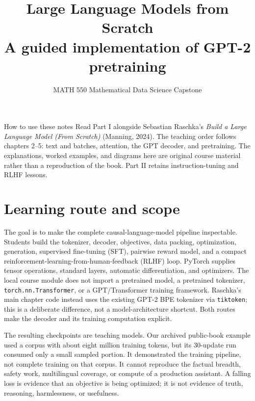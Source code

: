 \documentclass[11pt]{article}
\title{\color{navy}\textbf{Large Language Models from Scratch}\\
\large A guided implementation of GPT-2 pretraining\\[3pt]}
\author{MATH 550 Mathematical Data Science Capstone}
\date{}
\begin{document}
\maketitle
\begin{studybox}{How to use these notes}
Read Part I alongside Sebastian Raschka's \emph{Build a Large Language Model
(From Scratch)} (Manning, 2024). The teaching order follows chapters 2--5:
text and batches, attention, the GPT decoder, and pretraining. The explanations,
worked examples, and diagrams here are original course material rather than a
reproduction of the book. Part II retains instruction-tuning and RLHF lessons.
\end{studybox}
\tableofcontents
\clearpage

\section{Learning route and scope}

The goal is to make the complete causal-language-model pipeline inspectable.
Students build the tokenizer, decoder, objectives, data packing, optimization,
generation, supervised fine-tuning (SFT), pairwise reward model, and a compact
reinforcement-learning-from-human-feedback (RLHF) loop. PyTorch supplies tensor
operations, standard layers, automatic differentiation, and optimizers. The
local course module does not import a pretrained model, a pretrained tokenizer,
\texttt{torch.nn.Transformer}, or a GPT/Transformer training framework.
Raschka's main chapter code instead uses the existing GPT-2 BPE tokenizer via
\texttt{tiktoken}; this is a deliberate difference, not a model-architecture
shortcut. Both routes make the decoder and its training computation explicit.

The resulting checkpoints are teaching models. Our archived public-book example
used a corpus with about eight million training tokens, but its 30-update run
consumed only a small sampled portion. It demonstrated the training pipeline,
not complete training on that corpus. It cannot reproduce the factual breadth, safety work,
multilingual coverage, or compute of a production assistant. A falling loss is
evidence that an objective is being optimized; it is not evidence of truth,
reasoning, harmlessness, or usefulness.
\end{document}
